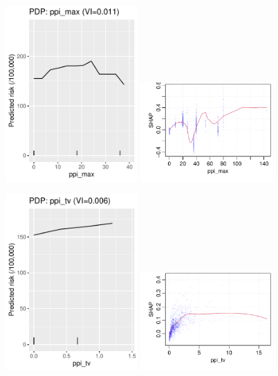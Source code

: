 \documentclass[12pt]{article}
\begin{document}
\begin{figure}[h]
\centering
\includegraphics[width=0.45\textwidth]{figures/pdp/ppi_max.pdf}
\includegraphics[width=0.45\textwidth]{figures/shap/ppi_max.pdf}
\end{figure}
\begin{figure}[h]
\centering
\includegraphics[width=0.45\textwidth]{figures/pdp/ppi_tv.pdf}
\includegraphics[width=0.45\textwidth]{figures/shap/ppi_tv.pdf}
\end{figure}
\end{document}
